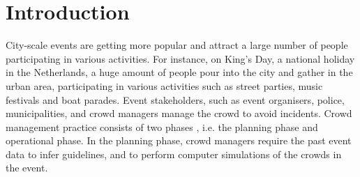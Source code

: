 



\chapter{Introduction}\label{ch1_title}

%


City-scale events are getting more popular and attract a large number of people participating in various activities. For instance, on King’s Day, a national holiday in the Netherlands, a huge amount of people pour into the city and gather in the urban area, participating in various activities such as street parties, music festivals and boat parades. Event stakeholders, such as event organisers, police, municipalities, and crowd managers manage the crowd to avoid incidents. Crowd management practice consists of two phases \citep{martella2017current}, i.e. the planning phase and operational phase. In the planning phase, crowd managers require the past event data to infer guidelines, and to perform computer simulations of the crowds in the event.
